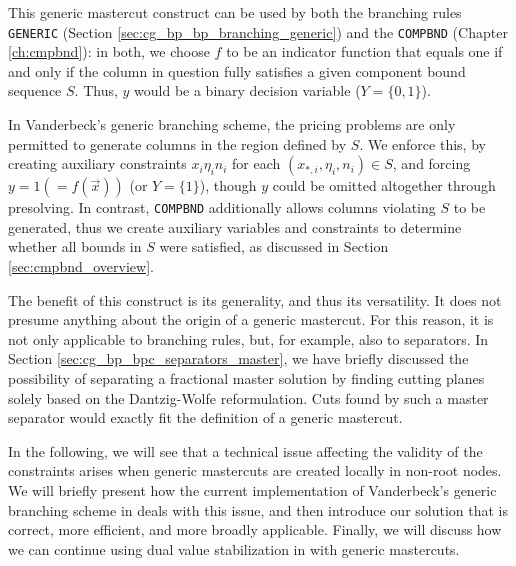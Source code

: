 This generic mastercut construct can be used by both the branching rules \texttt{GENERIC} (Section \ref{sec:cg_bp_bp_branching_generic}) and the \texttt{COMPBND} (Chapter \ref{ch:cmpbnd}): in both, we choose $f$ to be an indicator function that equals one if and only if the column in question fully satisfies a given component bound sequence $S$. Thus, $y$ would be a binary decision variable ($Y = \{0, 1\}$).

In Vanderbeck's generic branching scheme, the pricing problems are only permitted to generate columns in the region defined by $S$. We enforce this, by creating auxiliary constraints $x_i \eta_i n_i$ for each $\left( x_{*,i}, \eta_i, n_i \right) \in S$, and forcing $y = 1 (= f(\vec{x}))$ (or $Y = \{1\}$), though $y$ could be omitted altogether through presolving. In contrast, \texttt{COMPBND} additionally allows columns violating $S$ to be generated, thus we create auxiliary variables and constraints to determine whether all bounds in $S$ were satisfied, as discussed in Section \ref{sec:cmpbnd_overview}.

The benefit of this construct is its generality, and thus its versatility. It does not presume anything about the origin of a generic mastercut. For this reason, it is not only applicable to branching rules, but, for example, also to separators. In Section \ref{sec:cg_bp_bpc_separators_master}, we have briefly discussed the possibility of separating a fractional master solution by finding cutting planes solely based on the Dantzig-Wolfe reformulation. Cuts found by such a master separator would exactly fit the definition of a generic mastercut.

In the following, we will see that a technical issue affecting the validity of the constraints arises when generic mastercuts are created locally in non-root nodes. We will briefly present how the current implementation of Vanderbeck's generic branching scheme in \GCG{} deals with this issue, and then introduce our solution that is correct, more efficient, and more broadly applicable. Finally, we will discuss how we can continue using dual value stabilization in \GCG{} with generic mastercuts.


